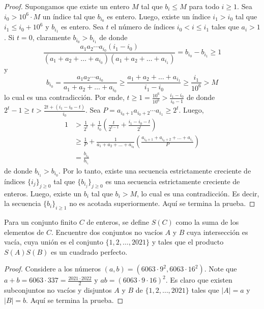 \begin{proof}
	Supongamos que existe un entero $M$ tal que $b_i\le M$ para todo $i\ge 1$. Sea $i_0>10^6\cdot M$ un índice tal que $b_{i_0}$ es entero. Luego, existe un índice $i_1>i_0$ tal que $i_1\le i_0+10^6$ y $b_{i_1}$ es entero. Sea $t$ el número de índices $i_0<i\le i_1$ tales que $a_i>1$. Si $t=0$, claramente $b_{i_0}>b_{i_1}$ de donde
	\[\frac{a_1a_2\cdots a_{i_0}(i_1-i_0)}{(a_1+a_2+\dots+a_{i_0})(a_1+a_2+\dots+a_{i_1})}=b_{i_0}-b_{i_1}\ge 1\]
	y
	\[b_{i_0}=\frac{a_1a_2\cdots a_{i_0}}{a_1+a_2+\dots+a_{i_0}}\ge\frac{a_1+a_2+\dots+a_{i_1}}{i_1-i_0}\ge\frac{i_1}{10^6}>M\]
	lo cual es una contradicción. Por ende, $t\ge 1=\frac{10^6}{10^6}>\frac{i_1-i_0}{i_0-1}$ de donde $2^t-1\ge t>\frac{2t+(i_1-i_0-t)}{i_0}$. Sea $P=a_{i_0+1}a_{i_0+2}\cdots a_{i_1}\ge 2^t$. Luego,
	\begin{align*}
		1
		&>\frac{1}{2^t}+\frac{1}{i_0}\left(\frac{t}{2^{t-1}}+\frac{i_1-i_0-t}{2^t}\right)\\
		&\ge\frac{1}{P}+\frac{1}{a_1+a_2+\dots+a_{i_0}}\left(\frac{a_{i_0+1}+a_{i_0+2}+\dots+a_{i_1}}{P}\right)\\
		&=\frac{b_{i_0}}{b_{i_1}}
	\end{align*}
	de donde $b_{i_1}>b_{i_0}$. Por lo tanto, existe una secuencia estrictamente creciente de índices $\{i_j\}_{j\ge 0}$ tal que $\{b_{i_j}\}_{j\ge 0}$ es una secuencia estrictamente creciente de enteros. Luego, existe un $b_i$ tal que $b_i>M$, lo cual es una contradicción. Es decir, la secuencia $\{b_i\}_{i\ge 1}$ no es acotada superiormente. Aquí se termina la prueba.
\end{proof}

\begin{probEB}[IberoAmerican 2021/5]
	Para un conjunto finito $C$ de enteros, se define $S(C)$ como la suma de los elementos de $C$. Encuentre dos conjuntos no vacíos $A$ y $B$ cuya intersección es vacía, cuya unión es el conjunto $\{1,2,\dots,2021\}$ y tales que el producto $S(A)S(B)$ es un cuadrado perfecto.
\end{probEB}

\begin{proof}
	Considere a los números $(a,b)=(6063\cdot 9^2,6063\cdot 16^2)$. Note que $a+b=6063\cdot 337=\frac{2021\cdot 2022}{2}$ y $ab=(6063\cdot 9\cdot 16)^2$. Es claro que existen subconjuntos no vacíos y disjuntos $A$ y $B$ de $\{1,2,\dots,2021\}$ tales que $|A|=a$ y $|B|=b$. Aquí se termina la prueba.
\end{proof}

